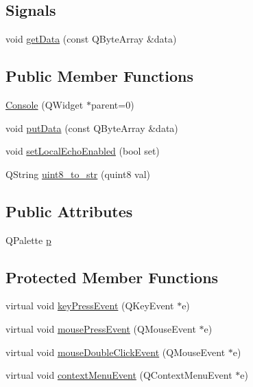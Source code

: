 \subsection*{Signals}
\begin{DoxyCompactItemize}
\item 
void \hyperlink{a00002_a1976aad46ce1a77be730bc628275038f}{get\+Data} (const Q\+Byte\+Array \&data)
\end{DoxyCompactItemize}
\subsection*{Public Member Functions}
\begin{DoxyCompactItemize}
\item 
\hyperlink{a00002_a1219e6e2000327a02434c56c514bbeda}{Console} (Q\+Widget $\ast$parent=0)
\item 
void \hyperlink{a00002_aa744a0868e01a13a502710f895f01525}{put\+Data} (const Q\+Byte\+Array \&data)
\item 
void \hyperlink{a00002_a5a17c5b6bc6719a26f73a5d0ac3d7de1}{set\+Local\+Echo\+Enabled} (bool set)
\item 
Q\+String \hyperlink{a00002_a9194022b884875614a4f7056454881c1}{uint8\+\_\+to\+\_\+str} (quint8 val)
\end{DoxyCompactItemize}
\subsection*{Public Attributes}
\begin{DoxyCompactItemize}
\item 
Q\+Palette \hyperlink{a00002_a097b52858dc4b9f1bec8d8d67518daf0}{p}
\end{DoxyCompactItemize}
\subsection*{Protected Member Functions}
\begin{DoxyCompactItemize}
\item 
virtual void \hyperlink{a00002_a558b58e3e68a167a7897a77bee78536c}{key\+Press\+Event} (Q\+Key\+Event $\ast$e)
\item 
virtual void \hyperlink{a00002_a615736fd63c7fc70536e2b775b0ce745}{mouse\+Press\+Event} (Q\+Mouse\+Event $\ast$e)
\item 
virtual void \hyperlink{a00002_a1727cadc147a07ed86fd4cb91908fd5f}{mouse\+Double\+Click\+Event} (Q\+Mouse\+Event $\ast$e)
\item 
virtual void \hyperlink{a00002_a199dade448d3ae597d420dc65abca11c}{context\+Menu\+Event} (Q\+Context\+Menu\+Event $\ast$e)
\end{DoxyCompactItemize}


